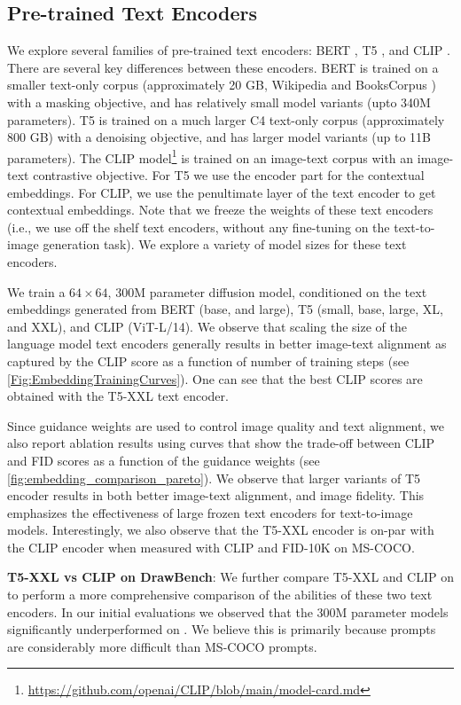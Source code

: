 \subsection{Pre-trained Text Encoders}
\label{sec:frozen_text_encoders}
We explore several families of pre-trained text encoders: BERT \cite{devlin-naacl-2019}, T5 \cite{raffel-jmlr-2020}, and CLIP \cite{radford-icml-2021}. 
There are several key differences between these encoders. BERT is trained on a smaller text-only corpus (approximately 20 GB, Wikipedia and BooksCorpus \cite{zhu-iccv-2015}) with a masking objective, and has relatively small model variants (upto 340M parameters). T5 is trained on a much larger C4 text-only corpus (approximately 800 GB) with a denoising objective, and has larger model variants (up to 11B parameters). The CLIP model\footnote{\url{https://github.com/openai/CLIP/blob/main/model-card.md}} is trained on an image-text corpus with an image-text contrastive objective. For T5 we use the encoder part for the contextual embeddings. For CLIP, we use the penultimate layer of the text encoder to get contextual embeddings. Note that we freeze the weights of these text encoders (i.e., we use off the shelf text encoders, without any fine-tuning on the text-to-image generation task). We explore a variety of model sizes for these text encoders.

We train a $64\times64$, 300M parameter diffusion model, conditioned on the text embeddings generated from BERT (base, and large), T5 (small, base, large, XL, and XXL), and CLIP (ViT-L/14). We observe that scaling the size of the language model text encoders generally results in better image-text alignment as captured by the CLIP score as a function of number of training steps (see \cref{Fig:EmbeddingTrainingCurves}).
One can see that the best CLIP scores are obtained with the T5-XXL text encoder. 

Since guidance weights are used to control image quality and text alignment, we also report ablation results using curves that show the trade-off between CLIP and FID scores as a function of the guidance weights (see \cref{fig:embedding_comparison_pareto}). We observe that larger variants of T5 encoder results in both better image-text alignment, and image fidelity. This emphasizes the effectiveness of large frozen text encoders for text-to-image models. Interestingly, we also observe that the T5-XXL encoder is on-par with the CLIP encoder when measured with CLIP and FID-10K on MS-COCO.

\textbf{T5-XXL vs CLIP on DrawBench}: We further compare T5-XXL and CLIP on \benchmarkname to perform a more comprehensive comparison of the abilities of these two text encoders. In our initial evaluations we observed that the 300M parameter models significantly underperformed on \benchmarkname. We believe this is primarily because \benchmarkname prompts are considerably more difficult than MS-COCO prompts. 

